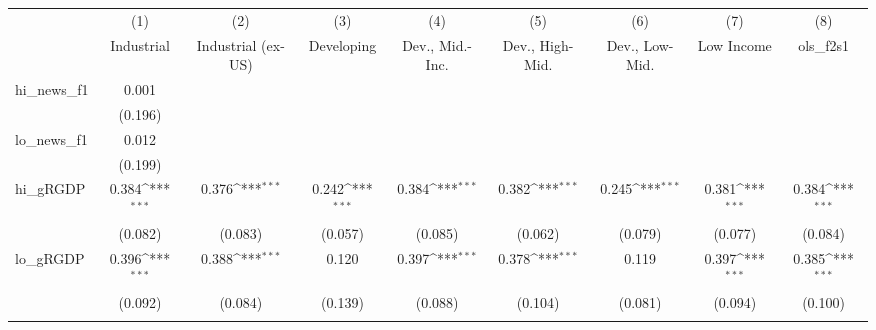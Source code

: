 {
\def\sym#1{\ifmmode^{#1}\else\(^{#1}\)\fi}
\begin{tabular}{l*{8}{c}}
\toprule
            &\multicolumn{1}{c}{(1)}&\multicolumn{1}{c}{(2)}&\multicolumn{1}{c}{(3)}&\multicolumn{1}{c}{(4)}&\multicolumn{1}{c}{(5)}&\multicolumn{1}{c}{(6)}&\multicolumn{1}{c}{(7)}&\multicolumn{1}{c}{(8)}\\
            &\multicolumn{1}{c}{Industrial}&\multicolumn{1}{c}{Industrial (ex-US)}&\multicolumn{1}{c}{Developing}&\multicolumn{1}{c}{Dev., Mid.-Inc.}&\multicolumn{1}{c}{Dev., High-Mid.}&\multicolumn{1}{c}{Dev., Low-Mid.}&\multicolumn{1}{c}{Low Income}&\multicolumn{1}{c}{ols\_f2s1}\\
\midrule
hi\_news\_f1  &       0.001         &                     &                     &                     &                     &                     &                     &                     \\
            &     (0.196)         &                     &                     &                     &                     &                     &                     &                     \\
\addlinespace
lo\_news\_f1  &       0.012         &                     &                     &                     &                     &                     &                     &                     \\
            &     (0.199)         &                     &                     &                     &                     &                     &                     &                     \\
\addlinespace
hi\_gRGDP    &       0.384\sym{***}&       0.376\sym{***}&       0.242\sym{***}&       0.384\sym{***}&       0.382\sym{***}&       0.245\sym{***}&       0.381\sym{***}&       0.384\sym{***}\\
            &     (0.082)         &     (0.083)         &     (0.057)         &     (0.085)         &     (0.062)         &     (0.079)         &     (0.077)         &     (0.084)         \\
\addlinespace
lo\_gRGDP    &       0.396\sym{***}&       0.388\sym{***}&       0.120         &       0.397\sym{***}&       0.378\sym{***}&       0.119         &       0.397\sym{***}&       0.385\sym{***}\\
            &     (0.092)         &     (0.084)         &     (0.139)         &     (0.088)         &     (0.104)         &     (0.081)         &     (0.094)         &     (0.100)         \\
\addlinespace

\end{tabular}}

